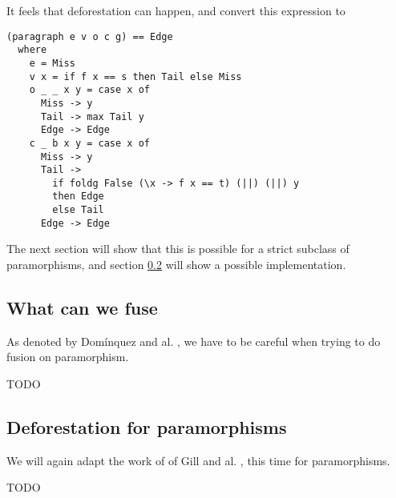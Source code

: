 \documentclass[format=sigplan]{acmart}
\begin{document}
It feels that deforestation can happen, and convert this expression to
\begin{verbatim}
(paragraph e v o c g) == Edge
  where
    e = Miss
    v x = if f x == s then Tail else Miss
    o _ _ x y = case x of
      Miss -> y
      Tail -> max Tail y
      Edge -> Edge
    c _ b x y = case x of
      Miss -> y
      Tail ->
        if foldg False (\x -> f x == t) (||) (||) y
        then Edge
        else Tail
      Edge -> Edge
\end{verbatim}

The next section will show that this is possible for a strict subclass of paramorphisms, and section \ref{sec:defor-para} will show a possible implementation.

\subsection{What can we fuse}

As denoted by Domínquez and al. \cite{paramorphismFusion}, we have to be careful when trying to do fusion on paramorphism.

TODO

\subsection{Deforestation for paramorphisms}
\label{sec:defor-para}
We will again adapt the work of of Gill and al. \cite{Gill:1993:SCD:165180.165214}, this time for paramorphisms.

\begin{acks}
TODO
\end{acks}
	



\end{document}
